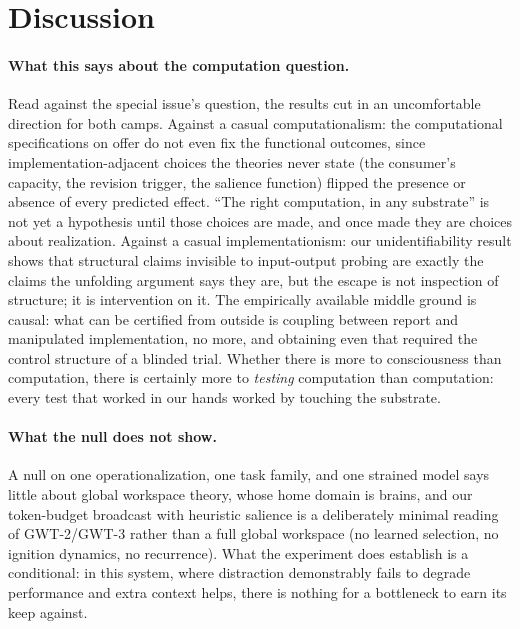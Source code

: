 \documentclass[11pt]{article}
\begin{document}
\section{Discussion}
\label{sec:discussion}

\paragraph{What this says about the computation question.} Read against the
special issue's question, the results cut in an uncomfortable direction for
both camps. Against a casual computationalism: the computational
specifications on offer do not even fix the functional outcomes, since
implementation-adjacent choices the theories never state (the consumer's
capacity, the revision trigger, the salience function) flipped the presence
or absence of every predicted effect. ``The right computation, in any
substrate'' is not yet a hypothesis until those choices are made, and once
made they are choices about realization. Against a casual implementationism:
our unidentifiability result shows that structural claims invisible to
input-output probing are exactly the claims the unfolding argument says they
are, but the escape is not inspection of structure; it is intervention on it.
The empirically available middle ground is causal: what can be certified from
outside is coupling between report and manipulated implementation, no more,
and obtaining even that required the control structure of a blinded trial.
Whether there is more to consciousness than computation, there is certainly
more to \emph{testing} computation than computation: every test that worked
in our hands worked by touching the substrate.

\paragraph{What the null does not show.} A null on one operationalization, one
task family, and one strained model says little about global workspace theory,
whose home domain is brains, and our token-budget broadcast with heuristic
salience is a deliberately minimal reading of GWT-2/GWT-3 rather than a full
global workspace (no learned selection, no ignition dynamics, no recurrence).
What the experiment does establish is a conditional: in this system, where
distraction demonstrably fails to degrade performance and extra context helps,
there is nothing for a bottleneck to earn its keep against.
\end{document}
